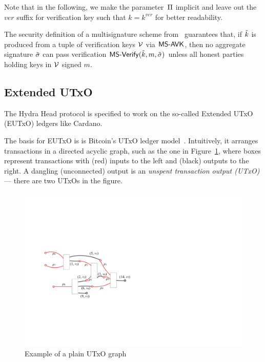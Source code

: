 Note that in the following, we make the parameter~$\Pi$ implicit and leave
out the $ver$ suffix for verification key such that $k = k^{ver}$ for better
readability.

The security definition of a multisignature scheme
from~\cite{itakura1983public,CCS:MicOhtRey01} guarantees that, if $\tilde{k}$ is
produced from a tuple of verification keys $\mathcal{V}$ via $\mathsf{MS\textsf{-}{}AVK}$,
then no aggregate signature $\tilde\sigma$ can pass verification
$\mathsf{MS\textsf{-}{}Verify}(\tilde{k},m,\tilde\sigma)$ unless all honest parties holding keys in
$\mathcal{V}$ signed $m$.

\subsection{Extended UTxO}
The Hydra Head protocol is specified to work on the so-called Extended UTxO (EUTxO) ledgers
like Cardano.

The basis for EUTxO is is Bitcoin's UTxO ledger
model~\cite{formal-model-of-bitcoin-transactions,Zahnentferner18-UTxO}.
Intuitively, it arranges transactions in a directed acyclic graph, such as the
one in Figure~\ref{fig:utxo-graph}, where boxes represent transactions with
(red) inputs to the left and (black) outputs to the right. A dangling
(unconnected) output is an \emph{unspent transaction output (UTxO)} --- there
are two UTxOs in the figure.

\begin{figure}[h]
  \centering
 \includegraphics[width=\textwidth/2]{figures/utxo-graph.pdf}
 \caption{Example of a plain UTxO graph}\label{fig:utxo-graph}
\end{figure}

